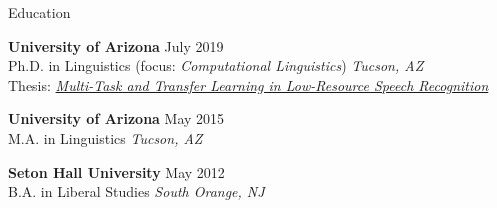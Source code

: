 \documentclass{resume} %
\begin{document}
\vspace{.5cm}
\begin{rSection}{Education}

{\bf University of Arizona} \hfill {July 2019} \\
Ph.D. in Linguistics (focus: \textit{Computational Linguistics}) \hfill {\em Tucson, AZ}\\
Thesis: \href{http://jrmeyer.github.io/misc/MEYER_dissertation_2019.pdf}{\textit{Multi-Task and Transfer Learning in Low-Resource Speech Recognition}} \hfill

\vspace{.15cm}

{\bf University of Arizona} \hfill {May 2015} \\
M.A. in Linguistics \hfill {\em Tucson, AZ}

\vspace{.15cm}

{\bf Seton Hall University} \hfill {May 2012} \\
B.A. in Liberal Studies \hfill {\em South Orange, NJ} \\



\end{rSection}


\vspace{.25cm}
\end{document}
